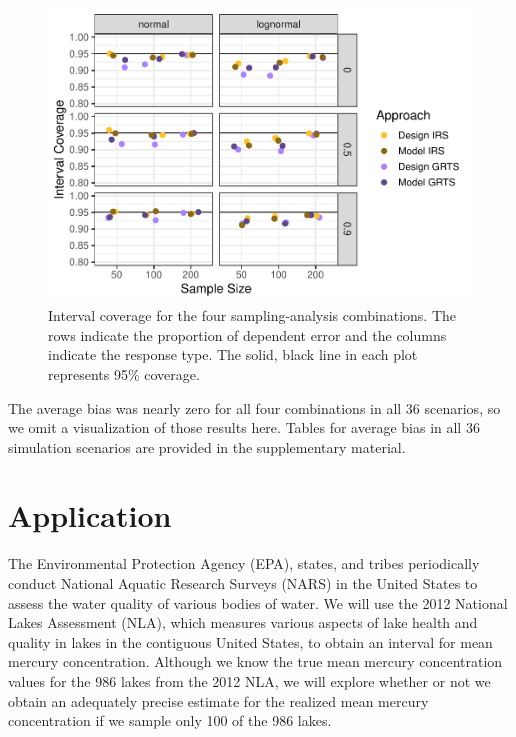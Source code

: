 \documentclass[]{elsarticle} %
\begin{document}
\begin{figure}
\includegraphics[width=1\linewidth]{manuscript_files/figure-latex/figconf-1} \caption{Interval coverage for the four sampling-analysis combinations. The rows indicate the proportion of dependent error and the columns indicate the response type. The solid, black line in each plot represents 95\% coverage.}\label{fig:figconf}
\end{figure}

The average bias was nearly zero for all four combinations in all 36
scenarios, so we omit a visualization of those results here. Tables for
average bias in all 36 simulation scenarios are provided in the
supplementary material.

\hypertarget{application}{%
\section{Application}\label{application}}

The Environmental Protection Agency (EPA), states, and tribes
periodically conduct National Aquatic Research Surveys (NARS) in the
United States to assess the water quality of various bodies of water. We
will use the 2012 National Lakes Assessment (NLA), which measures
various aspects of lake health and quality in lakes in the contiguous
United States, to obtain an interval for mean mercury concentration.
Although we know the true mean mercury concentration values for the 986
lakes from the 2012 NLA, we will explore whether or not we obtain an
adequately precise estimate for the realized mean mercury concentration
if we sample only 100 of the 986 lakes.
\end{document}
